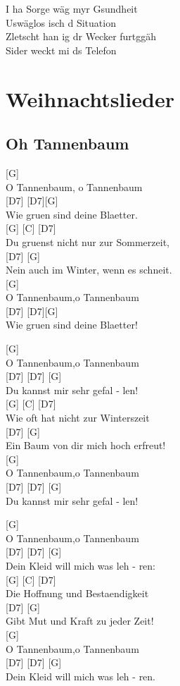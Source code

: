 \documentclass[
  letterpaper,
]{scrbook}
\begin{document}
I ha Sorge wäg myr Gsundheit\\
Uswäglos isch d Situation\\
Zletscht han ig dr Wecker furtggäh\\
Sider weckt mi ds Telefon

\part{Weihnachtslieder}

\hypertarget{oh-tannenbaum}{%
\chapter{Oh Tannenbaum}\label{oh-tannenbaum}}

{[}G{]}\\
O Tannenbaum, o Tannenbaum\\
{[}D7{]} {[}D7{]}{[}G{]}\\
Wie gruen sind deine Blaetter.\\
{[}G{]} {[}C{]} {[}D7{]}\\
Du gruenst nicht nur zur Sommerzeit,\\
{[}D7{]} {[}G{]}\\
Nein auch im Winter, wenn es schneit.\\
{[}G{]}\\
O Tannenbaum,o Tannenbaum\\
{[}D7{]} {[}D7{]}{[}G{]}\\
Wie gruen sind deine Blaetter!

{[}G{]}\\
O Tannenbaum,o Tannenbaum\\
{[}D7{]} {[}D7{]} {[}G{]}\\
Du kannst mir sehr gefal - len!\\
{[}G{]} {[}C{]} {[}D7{]}\\
Wie oft hat nicht zur Winterszeit\\
{[}D7{]} {[}G{]}\\
Ein Baum von dir mich hoch erfreut!\\
{[}G{]}\\
O Tannenbaum,o Tannenbaum\\
{[}D7{]} {[}D7{]} {[}G{]}\\
Du kannst mir sehr gefal - len!

{[}G{]}\\
O Tannenbaum,o Tannenbaum\\
{[}D7{]} {[}D7{]} {[}G{]}\\
Dein Kleid will mich was leh - ren:\\
{[}G{]} {[}C{]} {[}D7{]}\\
Die Hoffnung und Bestaendigkeit\\
{[}D7{]} {[}G{]}\\
Gibt Mut und Kraft zu jeder Zeit!\\
{[}G{]}\\
O Tannenbaum,o Tannenbaum\\
{[}D7{]} {[}D7{]} {[}G{]}\\
Dein Kleid will mich was leh - ren.
\end{document}
